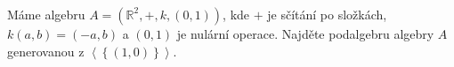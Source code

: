 \subsubsection{}
Máme algebru $A=\left ( \mathbb{R}^{2},+,k,\left ( 0,1 \right ) \right )$, kde
$+$ je sčítání po složkách, $k\left ( a,b \right )=\left ( -a,b \right )$ a
$(0,1)$ je nulární operace. Najděte podalgebru algebry $A$ generovanou z $\left
\langle \left \{ \left ( 1,0 \right ) \right \} \right \rangle$.
